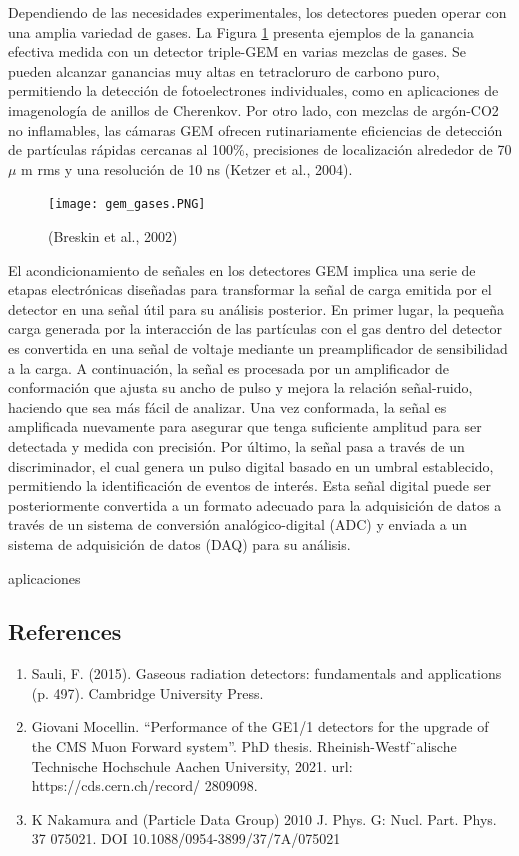 \documentclass[]{book}
\begin{document}
\noindent Dependiendo de las necesidades experimentales, los detectores pueden operar con una amplia variedad de gases. La Figura \ref{fig:gem_gases} presenta ejemplos de la ganancia efectiva medida con un detector triple-GEM en varias mezclas de gases. Se pueden alcanzar ganancias muy altas en tetracloruro de carbono puro, permitiendo la detección de fotoelectrones individuales, como en aplicaciones de imagenología de anillos de Cherenkov. Por otro lado, con mezclas de argón-CO2 no inflamables, las cámaras GEM ofrecen rutinariamente eficiencias de detección de partículas rápidas cercanas al 100\%, precisiones de localización alrededor de 70 $\mu$ m rms y una resolución de 10 ns (Ketzer et al., 2004).

\begin{figure}[H]
    \centering
    \texttt{[image: gem\_gases.PNG]}
    \caption{(Breskin et al., 2002)}
    \label{fig:gem_gases}
\end{figure}

\noindent El acondicionamiento de señales en los detectores GEM implica una serie de etapas electrónicas diseñadas para transformar la señal de carga emitida por el detector en una señal útil para su análisis posterior. En primer lugar, la pequeña carga generada por la interacción de las partículas con el gas dentro del detector es convertida en una señal de voltaje mediante un preamplificador de sensibilidad a la carga. A continuación, la señal es procesada por un amplificador de conformación que ajusta su ancho de pulso y mejora la relación señal-ruido, haciendo que sea más fácil de analizar. Una vez conformada, la señal es amplificada nuevamente para asegurar que tenga suficiente amplitud para ser detectada y medida con precisión. Por último, la señal pasa a través de un discriminador, el cual genera un pulso digital basado en un umbral establecido, permitiendo la identificación de eventos de interés. Esta señal digital puede ser posteriormente convertida a un formato adecuado para la adquisición de datos a través de un sistema de conversión analógico-digital (ADC) y enviada a un sistema de adquisición de datos (DAQ) para su análisis.

\noindent aplicaciones

\subsection*{References}
\begin{enumerate}
    \item Sauli, F. (2015). Gaseous radiation detectors: fundamentals and applications (p. 497). Cambridge University Press.
    \item Giovani Mocellin. “Performance of the GE1/1 detectors for the upgrade of the
    CMS Muon Forward system”. PhD thesis. Rheinish-Westf¨alische Technische
    Hochschule Aachen University, 2021. url: https://cds.cern.ch/record/
    2809098.
    \item K Nakamura and (Particle Data Group) 2010 J. Phys. G: Nucl. Part. Phys. 37 075021. DOI 10.1088/0954-3899/37/7A/075021
\end{enumerate}
\end{document}
